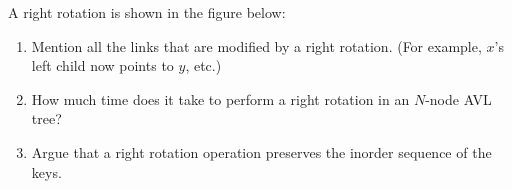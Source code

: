 A right rotation is shown in the figure below:


\par
\begin{figure}[h]
\centerline{}\end{figure}

\par

\begin{enumerate}

\item  Mention all the links that are modified by a right rotation.
(For example, $x$'s left child now points to $y$, etc.)

\item  How much time does it take to perform a right rotation in an
$N$-node AVL tree?

\item  Argue that a right rotation operation preserves the inorder
sequence of the keys.

\end{enumerate}
